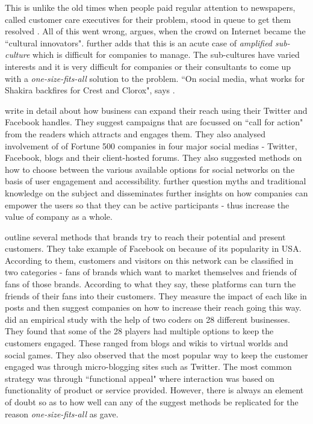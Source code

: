 \documentclass{article}
\begin{document}
This is unlike the old times when people paid regular attention to newspapers, called customer care executives for their problem, stood in queue to get them resolved \citep{culnan2010}. All of this went wrong, \cite{holt2016} argues, when the crowd on Internet became the ``cultural innovators". \cite{holt2016} further adds that this is an acute case of \textit{amplified sub-culture} which is difficult for companies to manage. The sub-cultures have varied interests and it is very difficult for companies or their consultants to come up with a \textit{one-size-fits-all} solution to the problem. ``On social media, what works for Shakira backfires for Crest and Clorox", says \cite{holt2016}. 

\cite{culnan2010} write in detail about how business can expand their reach using their Twitter and Facebook handles. They suggest campaigns that are focussed on ``call for action" from the readers which attracts and engages them. They also analysed involvement of of Fortune 500 companies in four major social medias - Twitter, Facebook, blogs and their client-hosted forums. They also suggested methods on how to choose between the various available options for social networks on the basis of user engagement and accessibility. \cite{hanna2011} further question myths and traditional knowledge on the subject and disseminates further insights on how companies can empower the users so that they can be active participants - thus increase the value of company as a whole. 

\cite{lipsman2012} outline several methods that brands try to reach their potential and present customers. They take example of Facebook on because of its popularity in USA. According to them, customers and visitors on this network can be classified in two categories - fans of brands which want to market themselves and friends of fans of those brands. According to what they say, these platforms can turn the friends of their fans into their customers. They measure the impact of each like in posts and then suggest companies on how to increase their reach going this way. \cite{ashley2015} did an empirical study with the help of two coders on 28 different businesses. They found that some of the 28 players had multiple options to keep the customers engaged. These ranged from blogs and wikis to virtual worlds and social games. They also observed that the most popular way to keep the customer engaged was through micro-blogging sites such as Twitter. The most common strategy was through ``functional appeal" where interaction was based on functionality of product or service provided. However, there is always an element of doubt so as to how well can any of the suggest methods be replicated for the reason \textit{one-size-fits-all} as \cite{holt2016} gave.
\end{document}
